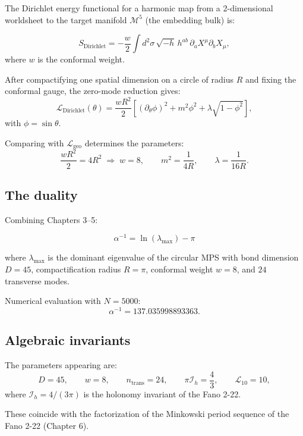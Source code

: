 \documentclass[12pt]{article}
\numberwithin{equation}{section}
\begin{document}
The Dirichlet energy functional for a harmonic map from a 2-dimensional worldsheet to the target manifold \(\mathcal{M}^5\) (the embedding bulk) is:

\begin{equation}\label{eq:polyakov}
S_{\text{Dirichlet}} = -\frac{w}{2} \int d^2\sigma \, \sqrt{-h} \, h^{ab} \, \partial_a X^\mu \partial_b X_\mu,
\end{equation}
where \(w\) is the conformal weight.

After compactifying one spatial dimension on a circle of radius \(R\) and fixing the conformal gauge, the zero-mode reduction gives:
\begin{equation}\label{eq:polyakov_reduced}
\mathcal{L}_{\text{Dirichlet}}(\theta) = \frac{w R^2}{2} \left[ (\partial_\theta \phi)^2 + m^2 \phi^2 + \lambda \sqrt{1-\phi^2} \right],
\end{equation}
with \(\phi = \sin\theta\).

Comparing with \(\mathcal{L}_{\text{geo}}\) determines the parameters:
\begin{equation}\label{eq:params_duality}
\frac{w R^2}{2} = 4R^2 \;\Rightarrow\; w = 8, \qquad
m^2 = \frac{1}{4R}, \qquad \lambda = \frac{1}{16R}.
\end{equation}

\subsection{The duality}

Combining Chapters 3–5:

\[
\boxed{\alpha^{-1} = \ln(\lambda_{\max}) - \pi}
\]

where \(\lambda_{\max}\) is the dominant eigenvalue of the circular MPS with bond dimension \(D=45\), compactification radius \(R=\pi\), conformal weight \(w=8\), and \(24\) transverse modes.

Numerical evaluation with \(N=5000\):
\[
\alpha^{-1} = 137.035998893363.
\]

\subsection{Algebraic invariants}

The parameters appearing are:
\[
D = 45,\qquad w = 8,\qquad n_{\text{trans}} = 24,\qquad \pi \mathcal{I}_h = \frac{4}{3},\qquad \mathcal{L}_{10} = 10,
\]
where \(\mathcal{I}_h = 4/(3\pi)\) is the holonomy invariant of the Fano 2-22.

These coincide with the factorization of the Minkowski period sequence of the Fano 2-22 (Chapter 6).
\end{document}
